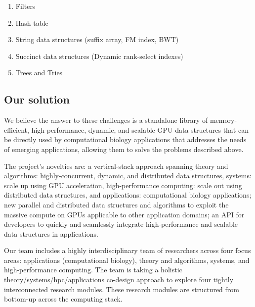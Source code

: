 \begin{enumerate}[noitemsep, leftmargin=*]
  \item Filters
  \item Hash table
  \item String data structures (suffix array, FM index, BWT)
  \item Succinct data structures (Dynamic rank-select indexes)
  \item Trees and Tries
\end{enumerate}

\subsection{Our solution}

We believe the answer to these challenges is a standalone library of
memory-efficient, high-performance, dynamic, and scalable GPU data structures
that can be directly used by computational biology applications that addresses
the needs of emerging applications, allowing them to solve the problems
described above.

The project’s novelties are: a vertical-stack approach spanning theory and
algorithms: highly-concurrent, dynamic, and distributed data structures,
systems: scale up using GPU acceleration, high-performance computing: scale out
using distributed data structures, and applications: computational biology
applications; new parallel and distributed data structures and algorithms to
exploit the massive compute on GPUs applicable to other application domains; an
API for developers to quickly and seamlessly integrate high-performance and
scalable data structures in applications.

Our team includes a highly interdisciplinary team of researchers across four
focus areas: applications (computational biology), theory and algorithms,
systems, and high-performance computing. The team is taking a holistic
theory/systems/hpc/applications co-design approach to explore four tightly
interconnected research modules.
These research modules are structured from bottom-up across the computing stack.

